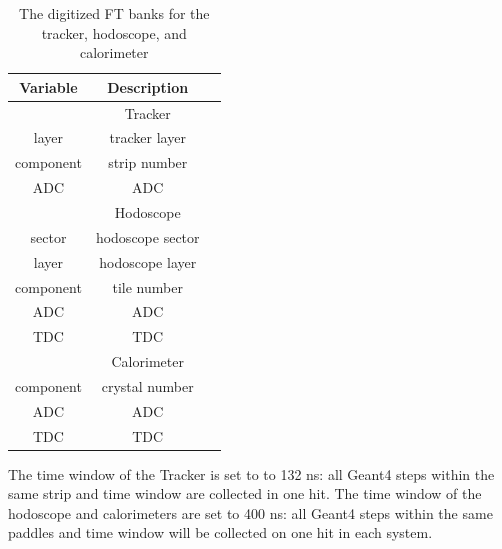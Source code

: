 \begin{table}[h]
	\begin{center}
		\begin{tabular}{| c | c | c |}
			\hline \hline
			Variable            & Description      \\
			\hline
		                         & Tracker         \\
			\hline
                          layer  &      tracker layer \\
                      component  &  strip number      \\
                            ADC  &        ADC         \\
			\hline
		                         & Hodoscope          \\
			\hline
						 sector  &     hodoscope sector  \\
                          layer  &      hodoscope layer  \\
                      component  &  tile number    \\
                            ADC  &        ADC      \\
                            TDC  &        TDC      \\
			\hline
								 & Calorimeter     \\
			\hline
					  component  &  crystal number \\
							ADC  &        ADC      \\
							TDC  &        TDC      \\
			\hline \hline
		\end{tabular}
	\end{center}
	\caption{The digitized FT banks for the tracker, hodoscope, and calorimeter}\label{tab:ftBank}
\end{table}

\noindent The time window  of the Tracker is set to to 132 ns: all Geant4 steps within the same strip and time window are collected in one hit.
The time window of the hodoscope and calorimeters are set to 400 ns: all Geant4 steps within the same paddles and time window
will be collected on one hit in each system.
